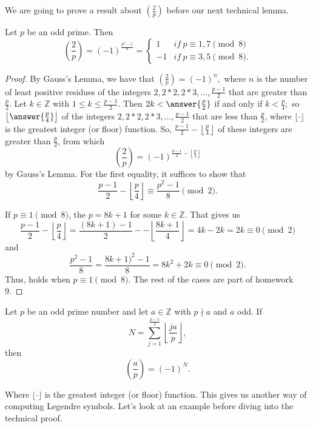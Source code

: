 \documentclass{ximera}
\theoremstyle{definition}
\begin{document}
We are going to prove a result about $\left(\frac{2}{p}\right)$ before our next technical lemma.

\begin{theorem}
 Let $p$ be an odd prime. Then 
\begin{equation*}
 \left(\frac{2}{p}\right)=(-1)^{\frac{p^2-1}{8}}=
\begin{cases}
 1& if\ p\equiv 1,7 \pmod 8\\
 -1 & if\ p\equiv 3,5 \pmod 8.
\end{cases}
\end{equation*}
\end{theorem}
\begin{proof}
 By Gauss's Lemma, we have that $\left(\frac{2}{p}\right)=(-1)^n,$ where $n$ is the number of least positive residues of the integers $2,2*2,2*3,\dots,\frac{p-1}{2}$ that are greater than $\frac{p}{2}$. Let $k\in\mathbb{Z}$ with $1\leq k\leq \frac{p-1}{2}$. Then $2k<\answer{\frac{p}{2}}
 $ if and only  if $k<\frac{p}{4};$ so $\left\lfloor\answer{\frac{p}{4}}
 \right\rfloor$ of the integers $2,2*2,2*3,\dots,\frac{p-1}{2}$ that are less than $\frac{p}{2}$, where $\lfloor\cdot\rfloor$ is the greatest integer (or floor) function. So, $\frac{p-1}{2}-\left\lfloor\frac{p}{4}\right\rfloor$  of these integers are greater than $\frac{p}{2}$, from which 
 \[\left(\frac{2}{p}\right)=(-1)^{\frac{p-1}{2}-\left\lfloor\frac{p}{4}\right\rfloor}\] by Gauss's Lemma. For the first equality, it suffices to show that 
 \[\frac{p-1}{2}-\left\lfloor\frac{p}{4}\right\rfloor\equiv \frac{p^2-1}{8} \pmod 2.\]
 
 If $p\equiv 1 \pmod 8$, the $p=8k+1$ for some $k\in\mathbb{Z}$. That gives us
 \[\frac{p-1}{2}-\left\lfloor\frac{p}{4}\right\rfloor=\frac{(8k+1)-1}{2}--\left\lfloor\frac{8k+1}{4}\right\rfloor=4k-2k=2k\equiv 0 \pmod 2\] and
 \[\frac{p^2-1}{8}=\frac{8k+1)^2-1}{8}=8k^2+2k\equiv 0\pmod 2.\]
 Thus,  holds when $p\equiv 1 \pmod 8$. The rest of the cases are part of homework 9.
\end{proof}

\begin{theorem}
 Let $p$ be an odd prime number and let $a\in\mathbb{Z}$ with $p\nmid a$ and $a$ odd. If \[N=\sum_{j=1}^{\frac{p-1}{2}}\left\lfloor\frac{ja}{p}\right\rfloor,\] then \[\left(\frac{a}{p}\right)=(-1)^N.\]
\end{theorem}
Where $\lfloor\cdot\rfloor$ is the greatest integer (or floor) function. This gives us another way of computing Legendre symbols. Let's look at an example before diving into the technical proof.
\end{document}
